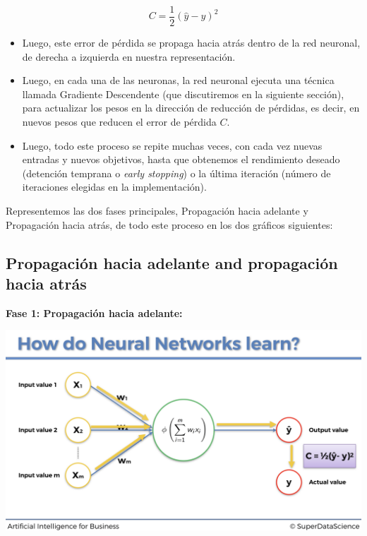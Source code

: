 \documentclass[]{book}
\providecommand{\tightlist}{%
  \setlength{\itemsep}{0pt}\setlength{\parskip}{0pt}}
\begin{document}
\[C = \frac{1}{2} (\hat{y} - y)^2\]

\begin{itemize}
\tightlist
\item
  Luego, este error de pérdida se propaga hacia atrás dentro de la red neuronal, de derecha a izquierda en nuestra representación.\\
\item
  Luego, en cada una de las neuronas, la red neuronal ejecuta una técnica llamada Gradiente Descendente (que discutiremos en la siguiente sección), para actualizar los pesos en la dirección de reducción de pérdidas, es decir, en nuevos pesos que reducen el error de pérdida \(C\).\\
\item
  Luego, todo este proceso se repite muchas veces, con cada vez nuevas entradas y nuevos objetivos, hasta que obtenemos el rendimiento deseado (detención temprana o \emph{early stopping}) o la última iteración (número de iteraciones elegidas en la implementación).
\end{itemize}

Representemos las dos fases principales, Propagación hacia adelante y Propagación hacia atrás, de todo este proceso en los dos gráficos siguientes:

\hypertarget{propagaciuxf3n-hacia-adelante-and-propagaciuxf3n-hacia-atruxe1s}{%
\subsection{Propagación hacia adelante and propagación hacia atrás}\label{propagaciuxf3n-hacia-adelante-and-propagaciuxf3n-hacia-atruxe1s}}

\textbf{Fase 1: Propagación hacia adelante:}

\includegraphics{Images/ANN_18.png}
\end{document}
